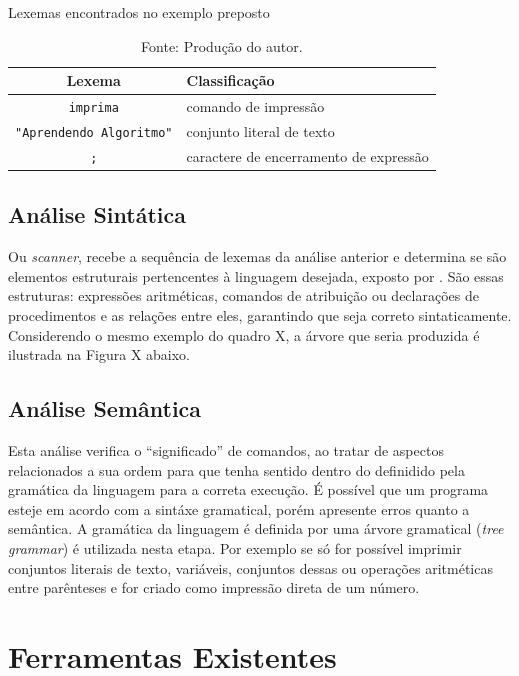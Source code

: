 \begin{table}[h]
\centering
  \caption{Lexemas encontrados no exemplo preposto}\label{tab:lexemas}
\begin{tabular}{ c | l }\hline
\textbf{Lexema} & \textbf{Classificação} \\ \hline
\texttt{imprima} & comando de impressão \\ \hline
\texttt{"Aprendendo Algoritmo"} & conjunto literal de texto \\ \hline
\texttt{;} & caractere de encerramento de expressão \\ \hline
\end{tabular}
  \caption*{\ifdraft{\color{green}}{}\footnotesize Fonte: Produção do autor.}
\end{table}

\subsection{Análise Sintática}

Ou \textit{scanner}, recebe a sequência de lexemas da análise anterior e determina se são elementos estruturais pertencentes à linguagem desejada, exposto por . São essas estruturas: expressões aritméticas, comandos de atribuição ou declarações de procedimentos e as relações entre eles, garantindo que seja correto sintaticamente. Considerendo o mesmo exemplo do quadro X, a árvore que seria produzida é ilustrada na Figura X abaixo.

\subsection{Análise Semântica}

Esta análise verifica o ``significado'' de comandos, ao tratar de aspectos relacionados a sua ordem para que tenha sentido dentro do definidido pela gramática da linguagem para a correta execução. É possível que um programa esteje em acordo com a sintáxe gramatical, porém apresente erros quanto a semântica. A gramática da linguagem é definida por uma árvore gramatical (\textit{tree grammar}) é utilizada nesta etapa. Por exemplo se só for possível imprimir conjuntos literais de texto, variáveis, conjuntos dessas ou operações aritméticas entre parênteses e for criado como impressão direta de um número.

\section{Ferramentas Existentes}

